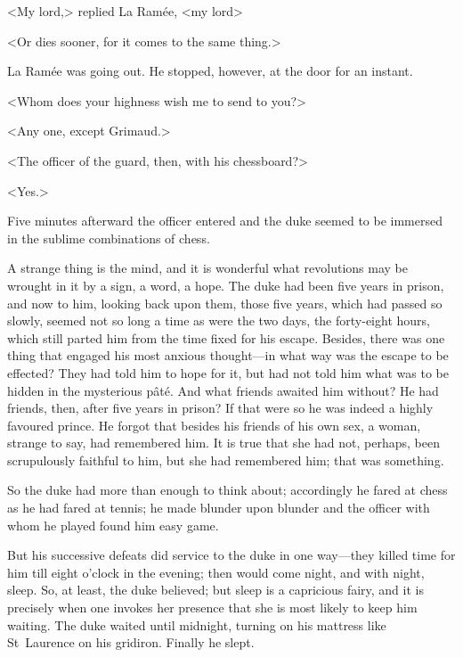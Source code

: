 <My lord,> replied La Ramée, <my lord\longdash>

<Or dies sooner, for it comes to the same thing.>

La Ramée was going out. He stopped, however, at the door for an instant.

<Whom does your highness wish me to send to you?>

<Any one, except Grimaud.>

<The officer of the guard, then, with his chessboard?>

<Yes.>

Five minutes afterward the officer entered and the duke seemed to be immersed in the sublime combinations of chess.

A strange thing is the mind, and it is wonderful what revolutions may be wrought in it by a sign, a word, a hope. The duke had been five years in prison, and now to him, looking back upon them, those five years, which had passed so slowly, seemed not so long a time as were the two days, the forty-eight hours, which still parted him from the time fixed for his escape. Besides, there was one thing that engaged his most anxious thought—in what way was the escape to be effected? They had told him to hope for it, but had not told him what was to be hidden in the mysterious pâté. And what friends awaited him without? He had friends, then, after five years in prison? If that were so he was indeed a highly favoured prince. He forgot that besides his friends of his own sex, a woman, strange to say, had remembered him. It is true that she had not, perhaps, been scrupulously faithful to him, but she had remembered him; that was something.

So the duke had more than enough to think about; accordingly he fared at chess as he had fared at tennis; he made blunder upon blunder and the officer with whom he played found him easy game.

But his successive defeats did service to the duke in one way—they killed time for him till eight o'clock in the evening; then would come night, and with night, sleep. So, at least, the duke believed; but sleep is a capricious fairy, and it is precisely when one invokes her presence that she is most likely to keep him waiting. The duke waited until midnight, turning on his mattress like St~Laurence on his gridiron. Finally he slept.

